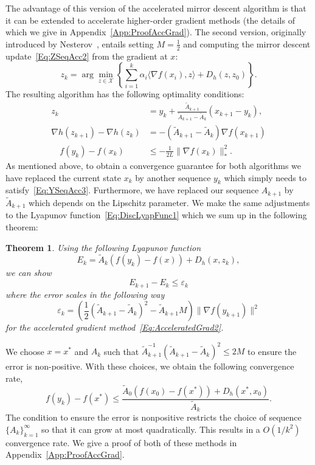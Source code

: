 \documentclass[11pt]{article}
\theoremstyle{plain}
\newtheorem{theorem}{Theorem}
\newcommand{\X}{{\mathcal X}}
\begin{document}
The advantage of this version of the accelerated mirror descent algorithm is that it can be extended to accelerate higher-order gradient methods (the details of which we give in Appendix~\ref{App:ProofAccGrad}). The second version, originally introduced by Nesterov~\cite{Nesterov05}, entails setting $M = \frac{1}{2}$ and computing the mirror descent update~\eqref{Eq:ZSeqAcc2} from the gradient at $x$:
\begin{equation*}
z_k = \arg \min_{z\in \X} \left\{ \sum_{i=1}^k \alpha_i \langle \nabla  f(x_i), z\rangle + D_h(z, z_0)\right\}.
\end{equation*}
The resulting algorithm has the following optimality conditions:
\begin{subequations}
\begin{align}
z_{k} &= y_k + \frac{\tilde A_{k+1}}{\tilde A_{k+1} -\tilde A_{k}} (x_{k+1} - y_k), \label{Eq:ZSeqAcc4}\\
\nabla h(z_{k+1}) - \nabla h(z_{k}) &= -(\tilde A_{k+1} -  \tilde A_{k})  \nabla f(x_{k+1})\label{Eq:XSeqAcc4}\\
\quad f(y_k) - f(x_k)  &\leq  -\frac{1}{2L} \| \nabla f(x_{k})\|_\ast^{2}. \label{Eq:YSeqAcc4}
\end{align}
\end{subequations}
As mentioned above, to obtain a convergence guarantee for both algorithms we have replaced the current state $x_k$ by another sequence $y_k$ which simply needs to satisfy~\eqref{Eq:YSeqAcc3}. Furthermore, we have replaced our sequence $A_{k+1}$ by $\tilde A_{k+1}$ which depends on the Lipschitz parameter. We make the same adjustments to the Lyapunov function~\eqref{Eq:DiscLyapFunc1} which we sum up in the following theorem:
\begin{theorem} \label{Thm:AccGrad}
Using the following Lyapunov function
\begin{equation}\label{Eq:LyapAccGrad}
E_k = \tilde A_k(  f(y_k) -  f(x)) + D_h(x, z_k),
\end{equation}
we can show
\[E_{k+1} - E_k \leq \varepsilon_k\]
where the error scales in the following way 
\[\varepsilon_k =  \left(\frac{1}{2}(\tilde A_{k+1} -\tilde A_{k})^{2}- \tilde A_{k+1}M\right)\|\nabla f(y_{k+1})\|^2 \]
for the accelerated gradient method~\eqref{Eq:AcceleratedGrad2}.
\end{theorem}
We choose $x = x^\ast$ and $A_k$ such that $\tilde A_{k+1}^{-1}(\tilde A_{k+1} -\tilde A_{k})^{2} \leq 2M$ to ensure the error is non-positive. With these choices, we obtain the following convergence rate,
\begin{equation}
 f(y_k) -  f(x^\ast) \leq \frac{\tilde A_0(f(x_0) - f(x^\ast)) + D_h(x^\ast, x_0)}{\tilde A_k}.
\end{equation}
The condition to ensure the error is nonpositive restricts the choice of sequence $\{A_k\}_{k=1}^\infty$ so that it can grow at most quadratically. This results in a $O(1/k^2)$ convergence rate.
We give a proof of both of these methods in Appendix~\ref{App:ProofAccGrad}.
\end{document}
